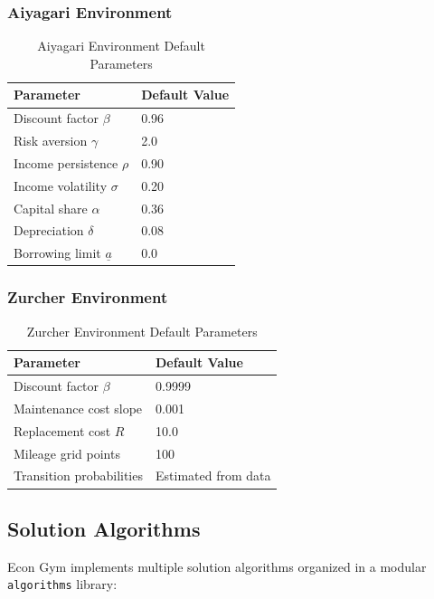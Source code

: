 \documentclass[12pt]{article}
\begin{document}
\subsubsection{Aiyagari Environment}

\begin{table}[H]
\centering
\begin{tabular}{ll}
\toprule
Parameter & Default Value \\
\midrule
Discount factor $\beta$ & 0.96 \\
Risk aversion $\gamma$ & 2.0 \\
Income persistence $\rho$ & 0.90 \\
Income volatility $\sigma$ & 0.20 \\
Capital share $\alpha$ & 0.36 \\
Depreciation $\delta$ & 0.08 \\
Borrowing limit $\underline{a}$ & 0.0 \\
\bottomrule
\end{tabular}
\caption{Aiyagari Environment Default Parameters}
\end{table}

\subsubsection{Zurcher Environment}

\begin{table}[H]
\centering
\begin{tabular}{ll}
\toprule
Parameter & Default Value \\
\midrule
Discount factor $\beta$ & 0.9999 \\
Maintenance cost slope & 0.001 \\
Replacement cost $R$ & 10.0 \\
Mileage grid points & 100 \\
Transition probabilities & Estimated from data \\
\bottomrule
\end{tabular}
\caption{Zurcher Environment Default Parameters}
\end{table}

\subsection{Solution Algorithms}

Econ Gym implements multiple solution algorithms organized in a modular \texttt{algorithms} library:
\end{document}
